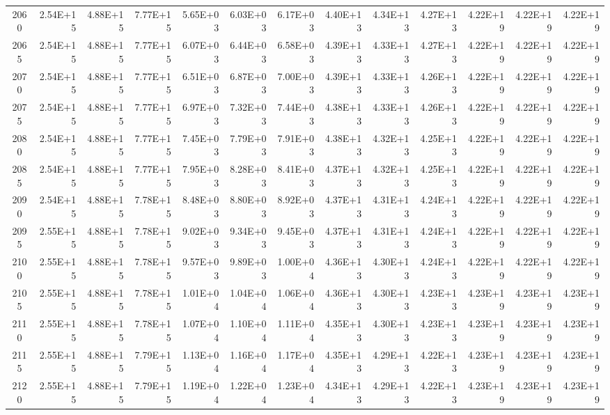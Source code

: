 \documentclass{article}
\begin{document}
\begin{table}
\begin{tabular}{crrr|rrr|rrr|rrr}
2060     & 2.54E+15   & 4.88E+15   & 7.77E+15   & 5.65E+03   & 6.03E+03   & 6.17E+03   & 4.40E+13   & 4.34E+13   & 4.27E+13   & 4.22E+19   & 4.22E+19   & 4.22E+19   \\
2065     & 2.54E+15   & 4.88E+15   & 7.77E+15   & 6.07E+03   & 6.44E+03   & 6.58E+03   & 4.39E+13   & 4.33E+13   & 4.27E+13   & 4.22E+19   & 4.22E+19   & 4.22E+19   \\
2070     & 2.54E+15   & 4.88E+15   & 7.77E+15   & 6.51E+03   & 6.87E+03   & 7.00E+03   & 4.39E+13   & 4.33E+13   & 4.26E+13   & 4.22E+19   & 4.22E+19   & 4.22E+19   \\
2075     & 2.54E+15   & 4.88E+15   & 7.77E+15   & 6.97E+03   & 7.32E+03   & 7.44E+03   & 4.38E+13   & 4.33E+13   & 4.26E+13   & 4.22E+19   & 4.22E+19   & 4.22E+19   \\
2080     & 2.54E+15   & 4.88E+15   & 7.77E+15   & 7.45E+03   & 7.79E+03   & 7.91E+03   & 4.38E+13   & 4.32E+13   & 4.25E+13   & 4.22E+19   & 4.22E+19   & 4.22E+19   \\
2085     & 2.54E+15   & 4.88E+15   & 7.77E+15   & 7.95E+03   & 8.28E+03   & 8.41E+03   & 4.37E+13   & 4.32E+13   & 4.25E+13   & 4.22E+19   & 4.22E+19   & 4.22E+19   \\
2090     & 2.54E+15   & 4.88E+15   & 7.78E+15   & 8.48E+03   & 8.80E+03   & 8.92E+03   & 4.37E+13   & 4.31E+13   & 4.24E+13   & 4.22E+19   & 4.22E+19   & 4.22E+19   \\
2095     & 2.55E+15   & 4.88E+15   & 7.78E+15   & 9.02E+03   & 9.34E+03   & 9.45E+03   & 4.37E+13   & 4.31E+13   & 4.24E+13   & 4.22E+19   & 4.22E+19   & 4.22E+19   \\
2100     & 2.55E+15   & 4.88E+15   & 7.78E+15   & 9.57E+03   & 9.89E+03   & 1.00E+04   & 4.36E+13   & 4.30E+13   & 4.24E+13   & 4.22E+19   & 4.22E+19   & 4.22E+19   \\
2105     & 2.55E+15   & 4.88E+15   & 7.78E+15   & 1.01E+04   & 1.04E+04   & 1.06E+04   & 4.36E+13   & 4.30E+13   & 4.23E+13   & 4.23E+19   & 4.23E+19   & 4.23E+19   \\
2110     & 2.55E+15   & 4.88E+15   & 7.78E+15   & 1.07E+04   & 1.10E+04   & 1.11E+04   & 4.35E+13   & 4.30E+13   & 4.23E+13   & 4.23E+19   & 4.23E+19   & 4.23E+19   \\
2115     & 2.55E+15   & 4.88E+15   & 7.79E+15   & 1.13E+04   & 1.16E+04   & 1.17E+04   & 4.35E+13   & 4.29E+13   & 4.22E+13   & 4.23E+19   & 4.23E+19   & 4.23E+19   \\
2120     & 2.55E+15   & 4.88E+15   & 7.79E+15   & 1.19E+04   & 1.22E+04   & 1.23E+04   & 4.34E+13   & 4.29E+13   & 4.22E+13   & 4.23E+19   & 4.23E+19   & 4.23E+19   \\

\end{tabular}
\end{table}
\end{document}
